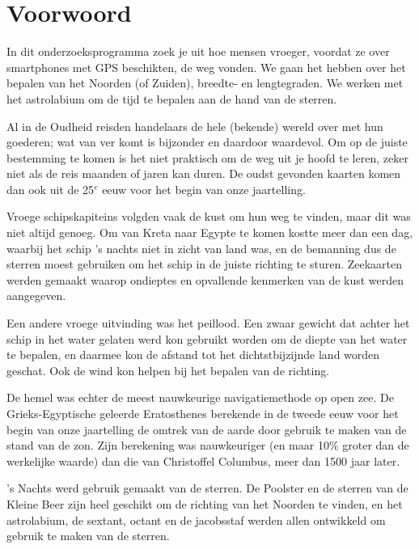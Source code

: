 \chapter*{Voorwoord}

In dit onderzoeksprogramma zoek je uit hoe mensen vroeger, voordat ze over smartphones met GPS beschikten, de weg vonden. We gaan het hebben over het bepalen van het Noorden (of Zuiden), breedte- en lengtegraden. We werken met het astrolabium om de tijd te bepalen aan de hand van de sterren.

Al in de Oudheid reisden handelaars de hele (bekende) wereld over met hun goederen; wat van ver komt is bijzonder en daardoor waardevol. Om op de juiste bestemming te komen is het niet praktisch om de weg uit je hoofd te leren, zeker niet als de reis maanden of jaren kan duren. De oudst gevonden kaarten komen dan ook uit de 25$^{e}$ eeuw voor het begin van onze jaartelling. 

Vroege schipskapiteins volgden vaak de kust om hun weg te vinden, maar dit was niet altijd genoeg. Om van Kreta naar Egypte te komen kostte meer dan een dag, waarbij het schip 's nachts niet in zicht van land was, en de bemanning dus de sterren moest gebruiken om het schip in de juiste richting te sturen. Zeekaarten werden gemaakt waarop ondieptes en opvallende kenmerken van de kust werden aangegeven.

Een andere vroege uitvinding was het peillood. Een zwaar gewicht dat achter het schip in het water gelaten werd kon gebruikt worden om de diepte van het water te bepalen, en daarmee kon de afstand tot het dichtstbijzijnde land worden geschat. Ook de wind kon helpen bij het bepalen van de richting.

De hemel was echter de meest nauwkeurige navigatiemethode op open zee. De Grieks-Egyptische geleerde Eratosthenes berekende in de tweede eeuw voor het begin van onze jaartelling de omtrek van de aarde door gebruik te maken van de stand van de zon. Zijn berekening was nauwkeuriger (en maar 10$\%$ groter dan de werkelijke waarde) dan die van Christoffel Columbus, meer dan 1500 jaar later.

's Nachts werd gebruik gemaakt van de sterren. De Poolster en de sterren van de Kleine Beer zijn heel geschikt om de richting van het Noorden te vinden, en het astrolabium, de sextant, octant en de jacobsstaf werden allen ontwikkeld om gebruik te maken van de sterren.


